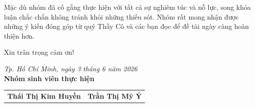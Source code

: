 Mặc dù nhóm đã cố gắng thực hiện với tất cả sự nghiêm túc và nỗ lực, song khóa luận chắc chắn không tránh khỏi những thiếu sót. Nhóm rất mong nhận được những ý kiến đóng góp từ quý Thầy Cô và các bạn đọc để đề tài ngày càng hoàn thiện hơn.

Xin trân trọng cảm ơn!

\begin{flushright}
\textit{Tp. Hồ Chí Minh, ngày 3 tháng 6 năm 2026} \\
\textbf{Nhóm sinh viên thực hiện} \\
\vspace{1.5cm}
\begin{tabular}{cc}
\textbf{Thái Thị Kim Huyền} & \textbf{Trần Thị Mỹ Ý}
\end{tabular}
\end{flushright}
